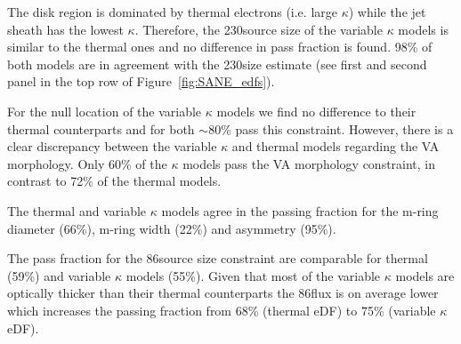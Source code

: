 
The disk region is dominated by thermal electrons (i.e. large $\kappa$) while the jet sheath has the lowest $\kappa$.
Therefore, the 230\GHz source size of the variable $\kappa$ models is similar to the thermal ones and no difference in pass fraction is found.
98\% of both models are in agreement with the 230\GHz size estimate (see first and second panel in the top row of Figure~\ref{fig:SANE_edfs}).


For the null location of the variable $\kappa$ models we find no difference to their thermal counterparts and for both $\sim$80\% pass this constraint.
However, there is a clear discrepancy between the variable $\kappa$ and thermal models regarding the VA morphology.
Only 60\% of the $\kappa$ models pass the VA morphology constraint, in contrast to 72\% of the thermal models.


The thermal and variable $\kappa$ models agree in the passing fraction for the m-ring diameter (66\%), m-ring width (22\%) and asymmetry (95\%).


The pass fraction for the 86\GHz source size constraint are comparable for thermal (59\%) and variable $\kappa$ models (55\%).
Given that most of the variable $\kappa$ models are optically thicker than their thermal counterparts the 86\GHz flux is on average lower which increases the passing fraction from 68\% (thermal eDF) to 75\% (variable $\kappa$ eDF).


